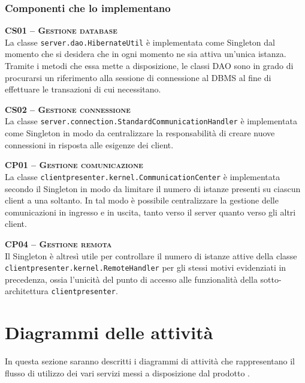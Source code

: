 \subsubsection{Componenti che lo implementano}
\begin{description}
  \item{\scshape\bfseries CS01 -- Gestione database}\\
La classe \texttt{server.dao.HibernateUtil} è implementata come Singleton dal momento che si desidera che in ogni momento ne sia attiva un'unica istanza. Tramite i metodi che essa mette a disposizione, le classi DAO sono in grado di procurarsi un riferimento alla sessione di connessione al DBMS al fine di effettuare le transazioni di cui necessitano.
  
  \item{\scshape\bfseries CS02 -- Gestione connessione}\\
La classe \texttt{server.connection.StandardCommunicationHandler} è implementata come Singleton in modo da centralizzare la responsabilità di creare nuove connessioni in risposta alle esigenze dei client.

  \item{\scshape\bfseries CP01 -- Gestione comunicazione}\\
La classe \texttt{clientpresenter.kernel.CommunicationCenter} è implementata secondo il  Singleton in modo da limitare il numero di istanze presenti su ciascun client a una soltanto. In tal modo è possibile centralizzare la gestione delle comunicazioni in ingresso e in uscita, tanto verso il server quanto verso gli altri client.

  \item{\scshape\bfseries CP04 -- Gestione remota}\\
Il  Singleton è altresì utile per controllare il numero di istanze attive della classe \texttt{clientpresenter.kernel.RemoteHandler} per gli stessi motivi evidenziati in precedenza, ossia l'unicità del punto di accesso alle funzionalità della sotto-architettura \texttt{clientpresenter}.

\end{description}
\clearpage

\section{Diagrammi delle attività}
In questa sezione saranno descritti i diagrammi di attività che rappresentano il flusso di utilizzo dei vari servizi messi a disposizione dal prodotto \caName.

